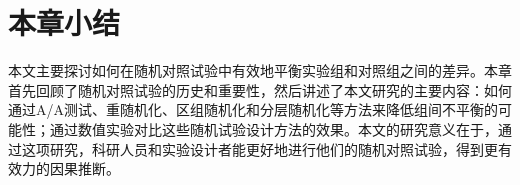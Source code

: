 \section{本章小结}

本文主要探讨如何在随机对照试验中有效地平衡实验组和对照组之间的差异。本章首先回顾了随机对照试验的历史和重要性，然后讲述了本文研究的主要内容：如何通过A/A测试、重随机化、区组随机化和分层随机化等方法来降低组间不平衡的可能性；通过数值实验对比这些随机试验设计方法的效果。本文的研究意义在于，通过这项研究，科研人员和实验设计者能更好地进行他们的随机对照试验，得到更有效力的因果推断。














